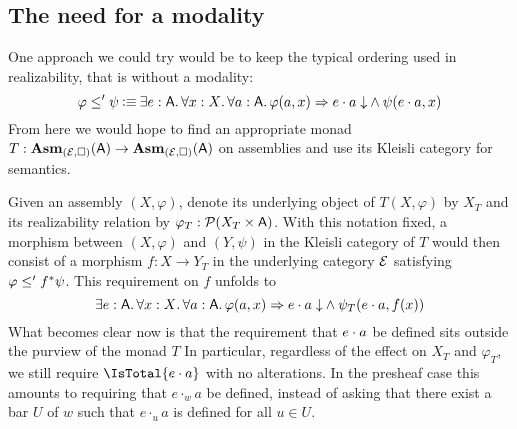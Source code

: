 \documentclass[11pt]{article}
\begin{document}

\subsection{The need for a modality}

One approach we could try would be to keep the typical ordering
used in realizability, that is without a modality:
%
\[
    \varphi \leq' \psi
    \IsDefined
    \IExists{e : \A}{
      \IForall{x : \X}{
        \IForall{a : \A}{
          \IImplies%
            {\varphi(a,x)}%
            {\IAnd%
              {\ITotal{\IAp{e}{a}}}%
              {\psi(\IAp{e}{a}, x)}
            }
        }
      }
    }
\]
%
From here we would hope to find an appropriate monad \(T : \mathbf{Asm}_{(\mathcal{E},\Box)}(\mathsf{A}) \to \mathbf{Asm}_{(\mathcal{E},\Box)}(\mathsf{A})\)
on assemblies and use its Kleisli category for semantics.

Given an assembly \((X,\varphi)\), denote its underlying
object of \(T(X,\varphi)\) by \(X_{T}\) and its realizability relation
by \(\varphi_{T}:\mathcal{P}{({X_{T}}\times{\ensuremath{\mathsf{A}}})}\).
%
With this notation fixed, a morphism between \((X,\varphi)\) and \((Y,\psi)\) in
the Kleisli category of \(T\) would then consist of a morphism
\(f : X \to Y_{T}\) in the underlying category \(\mathcal{E}\) satisfying
\(\varphi \leq' {f}^\ast\psi\).
%
This requirement on \(f\) unfolds to
%
\[
  \IExists{e : \A}{
    \IForall{x : \X}{
      \IForall{a : \A}{
        \IImplies%
          {\varphi(a,x)}%
          {\IAnd%
            {\ITotal{\IAp{e}{a}}}%
            {\psi_{T}(\IAp{e}{a}, f(x))}
          }
      }
    }
  }
\]
%
What becomes clear now is that the requirement that \({e}\cdot{a}\)
be defined sits outside the purview of the monad \(T\)
%
In particular, regardless of the effect on \(X_{T}\) and \(\varphi_{T}\), we
still require \(\IsTotal{\IAp{e}{a}}\) with no alterations.
%
In the presheaf case this amounts to requiring that \({e}\cdot_{w}{a}\)
be defined, instead of asking that there exist a bar \(U\) of \(w\)
such that \({e}\cdot_{u}{a}\) is defined for all \(u \in U\).
\end{document}
